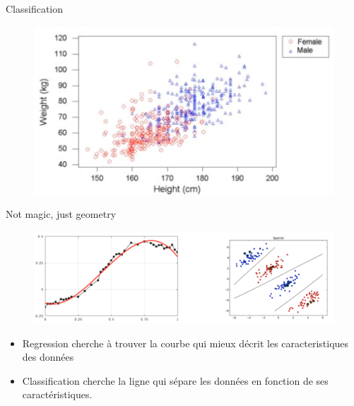 \documentclass[aspectratio=169,xcolor=dvipsnames, t]{beamer}
\begin{document}
\begin{frame}{Classification}
	\begin{figure}
		\includegraphics[height=0.6\paperheight ]{figures/cm2_notMagicClassification.png}
	\end{figure}

\end{frame}

\begin{frame}{Not magic, just geometry}
\begin{figure}
	\includegraphics[height=0.45\paperheight ]{figures/cm2_notMagicClassification2.png}
\end{figure}
\begin{itemize}
	\item Regression cherche à trouver la courbe qui mieux décrit les caracteristiques des données
	\item Classification cherche la ligne qui sépare les données en fonction de ses caractéristiques.
\end{itemize}
\end{frame}

\end{document}
